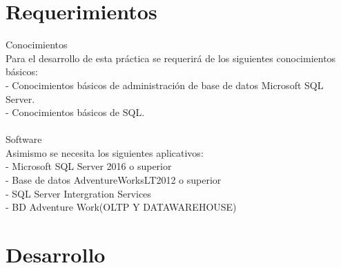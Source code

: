\documentclass[12pt,letterpaper]{article}
\begin{document}
\section{Requerimientos}
Conocimientos
\\Para el desarrollo de esta práctica se requerirá de los siguientes conocimientos básicos:
\\- Conocimientos básicos de administración de base de datos Microsoft SQL Server.
\\- Conocimientos básicos de SQL.
\\\\Software
\\Asimismo se necesita los siguientes aplicativos:
\\- Microsoft SQL Server 2016 o superior
\\- Base de datos AdventureWorksLT2012 o superior
\\- SQL Server Intergration Services
\\- BD Adventure Work(OLTP Y DATAWAREHOUSE)


\section{Desarrollo}
\end{document}
